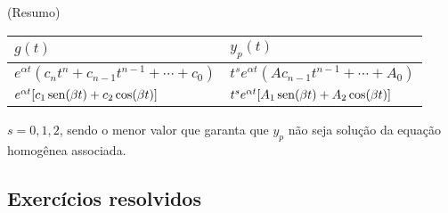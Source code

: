\begin{obs}(Resumo)\label{obs:edolin_o2_mcd}
  \begin{center}
  \begin{tabular}{ll}
    $g(t)$ & $y_p(t)$ \\\hline
    $e^{\alpha t}(c_nt^n + c_{n-1}t^{n-1} + \cdots + c_0)$ & $t^se^{\alpha t}(Ac_{n-1}t^{n-1} + \cdots + A_0)$ \\
    $e^{\alpha t}[c_1\operatorname{sen}(\beta t) + c_2\cos(\beta t)]$ & $t^se^{\alpha t}[A_1\operatorname{sen}(\beta t) + A_2\cos(\beta t)]$ \\\hline
  \end{tabular}
\end{center}
  $s = 0, 1, 2$, sendo o menor valor que garanta que $y_p$ não seja solução da equação homogênea associada.
\end{obs}

\subsection*{Exercícios resolvidos}


